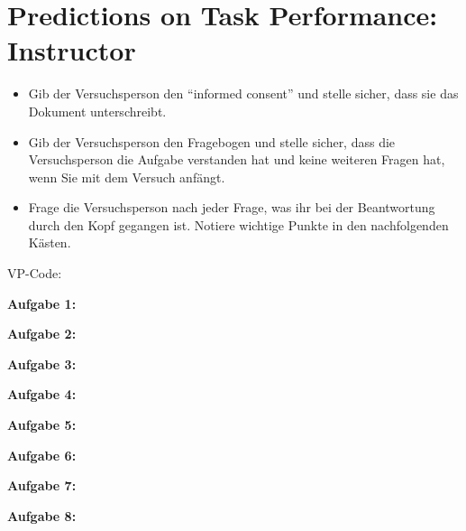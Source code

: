 \documentclass[color=9c]{tudaexercise}
\def\boxheight{1.3cm}
\begin{document}
\section*{Predictions on Task Performance: Instructor}

\begin{itemize}
	\item Gib der Versuchsperson den ``informed consent'' und stelle sicher, dass sie das Dokument unterschreibt.
	\item Gib der Versuchsperson den Fragebogen und stelle sicher, dass die Versuchsperson die Aufgabe verstanden hat und keine weiteren Fragen hat, wenn Sie mit dem Versuch anfängt.
	\item Frage die Versuchsperson nach jeder Frage, was ihr bei der Beantwortung durch den Kopf gegangen ist. Notiere wichtige Punkte in den nachfolgenden Kästen.
\end{itemize}

VP-Code: \fbox{\color{white}\rule{2cm}{7mm}\color{black}}

\noindent\textbf{Aufgabe 1:}\\
\fbox{\color{white}\rule{.99\linewidth}{\boxheight}\color{black}}

\noindent\textbf{Aufgabe 2:}\\
\fbox{\color{white}\rule{.99\linewidth}{\boxheight}\color{black}}

\noindent\textbf{Aufgabe 3:}\\
\fbox{\color{white}\rule{.99\linewidth}{\boxheight}\color{black}}

\noindent\textbf{Aufgabe 4:}\\
\fbox{\color{white}\rule{.99\linewidth}{\boxheight}\color{black}}

\noindent\textbf{Aufgabe 5:}\\
\fbox{\color{white}\rule{.99\linewidth}{\boxheight}\color{black}}

\noindent\textbf{Aufgabe 6:}\\
\fbox{\color{white}\rule{.99\linewidth}{\boxheight}\color{black}}

\noindent\textbf{Aufgabe 7:}\\
\fbox{\color{white}\rule{.99\linewidth}{\boxheight}\color{black}}

\noindent\textbf{Aufgabe 8:}\\
\fbox{\color{white}\rule{.99\linewidth}{\boxheight}\color{black}}
\end{document}
